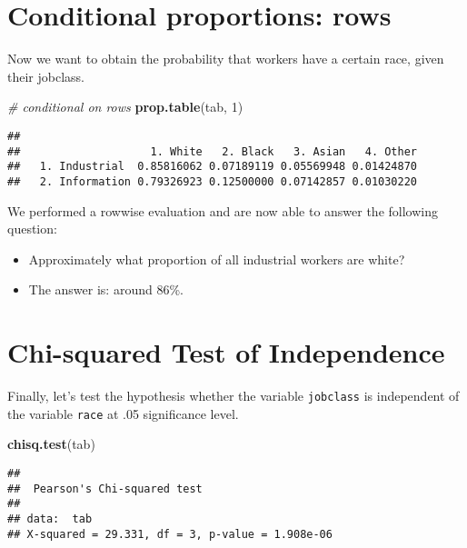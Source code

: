 \documentclass[
]{book}
\newenvironment{Shaded}{\begin{snugshade}}{\end{snugshade}}
\newcommand{\CommentTok}[1]{\textcolor[rgb]{0.56,0.35,0.01}{\textit{#1}}}
\newcommand{\DecValTok}[1]{\textcolor[rgb]{0.00,0.00,0.81}{#1}}
\newcommand{\KeywordTok}[1]{\textcolor[rgb]{0.13,0.29,0.53}{\textbf{#1}}}
\newcommand{\NormalTok}[1]{#1}
\providecommand{\tightlist}{%
  \setlength{\itemsep}{0pt}\setlength{\parskip}{0pt}}
\begin{document}
\hypertarget{conditional-proportions-rows}{%
\section{Conditional proportions: rows}\label{conditional-proportions-rows}}

Now we want to obtain the probability that workers have a certain race, given their jobclass.

\begin{Shaded}
\begin{Highlighting}[]
\CommentTok{\# conditional on rows}
\KeywordTok{prop.table}\NormalTok{(tab, }\DecValTok{1}\NormalTok{)  }
\end{Highlighting}
\end{Shaded}

\begin{verbatim}
##                 
##                    1. White   2. Black   3. Asian   4. Other
##   1. Industrial  0.85816062 0.07189119 0.05569948 0.01424870
##   2. Information 0.79326923 0.12500000 0.07142857 0.01030220
\end{verbatim}

We performed a rowwise evaluation and are now able to answer the following question:

\begin{itemize}
\tightlist
\item
  Approximately what proportion of all industrial workers are white?
\item
  The answer is: around 86\%.
\end{itemize}

\hypertarget{chi-squared-test-of-independence}{%
\section{Chi-squared Test of Independence}\label{chi-squared-test-of-independence}}

Finally, let's test the hypothesis whether the variable \texttt{jobclass} is independent of the variable \texttt{race} at .05 significance level.

\begin{Shaded}
\begin{Highlighting}[]
\KeywordTok{chisq.test}\NormalTok{(tab)  }
\end{Highlighting}
\end{Shaded}

\begin{verbatim}
## 
##  Pearson's Chi-squared test
## 
## data:  tab
## X-squared = 29.331, df = 3, p-value = 1.908e-06
\end{verbatim}
\end{document}
